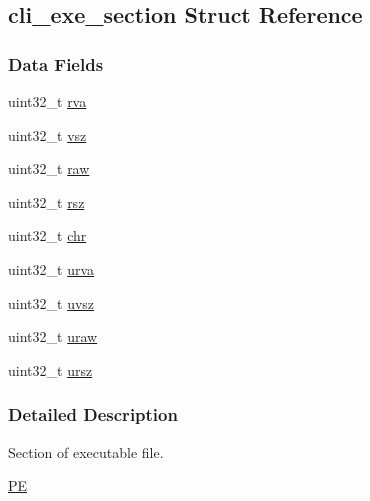 \hypertarget{structcli__exe__section}{
\subsection{cli\_\-exe\_\-section Struct Reference}
\label{structcli__exe__section}
}
\subsubsection*{Data Fields}
\begin{DoxyCompactItemize}
\item 
uint32\_\-t \hyperlink{structcli__exe__section_a428af6b898632e49e1a78a6b75c35597}{rva}
\item 
uint32\_\-t \hyperlink{structcli__exe__section_a4e9a2c96ba84fd9dedbed61c9865cbc7}{vsz}
\item 
uint32\_\-t \hyperlink{structcli__exe__section_a0a595268561edc58e347ca8387000bc6}{raw}
\item 
uint32\_\-t \hyperlink{structcli__exe__section_a9d1a35dea930f9ddac78908ca3dce76b}{rsz}
\item 
uint32\_\-t \hyperlink{structcli__exe__section_a0737a11eee3c5a5d691fade6df9f5094}{chr}
\item 
uint32\_\-t \hyperlink{structcli__exe__section_a932862bb5ce030d0e6f007068e7817d6}{urva}
\item 
uint32\_\-t \hyperlink{structcli__exe__section_a4241ef43b0b01fea785fe76ba7054a37}{uvsz}
\item 
uint32\_\-t \hyperlink{structcli__exe__section_a1c392d2998c0846b21909814e4706a1e}{uraw}
\item 
uint32\_\-t \hyperlink{structcli__exe__section_a69f4a0067dad89980f815b5704f5f8da}{ursz}
\end{DoxyCompactItemize}


\subsubsection{Detailed Description}
Section of executable file. \begin{Desc}
\item[\hyperlink{pe__pe000003}{PE}]\end{Desc}


